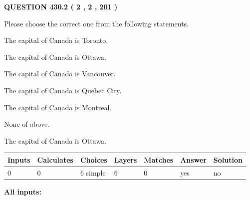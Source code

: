 \documentclass[12pt]{article}
\begin{document}
   
  
\vspace{0.2in}
  
{\textbf{\Large{QUESTION
430.2 
 ( 2 , 2 , 201 )
}}}
  
  
Please choose the correct one from the following statements.
 
 
The capital of Canada is Toronto.
 
 
The capital of Canada is Ottawa.
 
 
The capital of Canada is Vancouver.
 
 
The capital of Canada is Quebec City.
 
 
The capital of Canada is Montreal.
 
 
 None of above.
 
 
\noindent{}
 
 
The capital of Canada is Ottawa.
 
 
\noindent{}
 
 
   
   
   
   
\noindent\begin{tabular}{|l|l|l|l|l|l|l|}
 \hline
Inputs & Calculates & Choices & Layers & Matches & Answer & Solution \\ \hline
 0  & 
 0  & 
 6
  simple  
  & 
 6  & 
 0  & 
  yes & 
  no 
  \\ \hline
 \end{tabular}
   
   
   
   
\noindent{}
   
   
   
   
\noindent\vspace{0.1in}\hspace{-0.08in} {\textbf{\Large{All inputs: }}}
   
   
   
   
   
   
 \vspace{0.2in}
 
   
   
\end{document}
